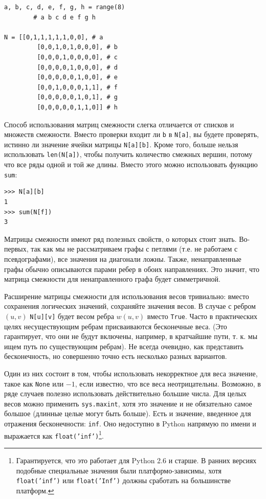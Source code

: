 \begin{lstlisting}[caption={Матрица смежности, реализованная с помощью вложенных списков},label={lst:adjacency}]
a, b, c, d, e, f, g, h = range(8)
	    # a b c d e f g h

N = [[0,1,1,1,1,1,0,0], # a
		 [0,0,1,0,1,0,0,0], # b
		 [0,0,0,1,0,0,0,0], # c
		 [0,0,0,0,1,0,0,0], # d
		 [0,0,0,0,0,1,0,0], # e
		 [0,0,1,0,0,0,1,1], # f
		 [0,0,0,0,0,1,0,1], # g
		 [0,0,0,0,0,1,1,0]] # h
\end{lstlisting}

Способ использования матриц смежности слегка отличается от списков и множеств смежности. Вместо проверки входит ли \texttt{b} в \texttt{N[a]}, вы будете проверять, истинно ли значение ячейки матрицы \texttt{N[a][b]}. Кроме того, больше нельзя использовать \texttt{len(N[a])}, чтобы получить количество смежных вершин, потому что все ряды одной и той же длины. Вместо этого можно использовать функцию \texttt{sum}:\begin{lstlisting}
>>> N[a][b]
1
>>> sum(N[f])
3
\end{lstlisting}

Матрицы смежности имеют ряд полезных свойств, о которых стоит знать. Во-первых, так как мы не рассматриваем графы с петлями (т.е. не работаем с псевдографами), все значения на диагонали ложны. Также, ненаправленные графы обычно описываются парами ребер в обоих направлениях. Это значит, что матрица смежности для ненаправленного графа будет симметричной.

Расширение матрицы смежности для использования весов тривиально: вместо сохранения логических значений, сохраняйте значения весов. В случае с ребром $(u, v)$ \texttt{N[u][v]} будет весом ребра $w(u,v)$ вместо \texttt{True}. Часто в практических целях несуществующим ребрам присваиваются бесконечные веса. (Это гарантирует, что они не будут включены, например, в кратчайшие пути, т. к. мы ищем путь по существующим ребрам). Не всегда очевидно, как представить бесконечность, но совершенно точно есть несколько разных вариантов.

Один из них состоит в том, чтобы использовать некорректное для веса значение, такое как \texttt{None} или $-1$, если известно, что все веса неотрицательны. Возможно, в ряде случаев полезно использовать действительно большие числа. Для целых весов можно применить \texttt{sys.maxint}, хотя это значение и не обязательно самое большое (длинные целые могут быть больше). Есть и значение, введенное для отражения бесконечности: \texttt{inf}. Оно недоступно в Python напрямую по имени и выражается как \texttt{float('inf')}\footnote{Гарантируется, что это работает для Python 2.6 и старше. В ранних версиях подобные специальные значения были платформо-зависимы, хотя \texttt{float('inf')} или \texttt{float('Inf')} должны сработать на большинстве платформ.}.

